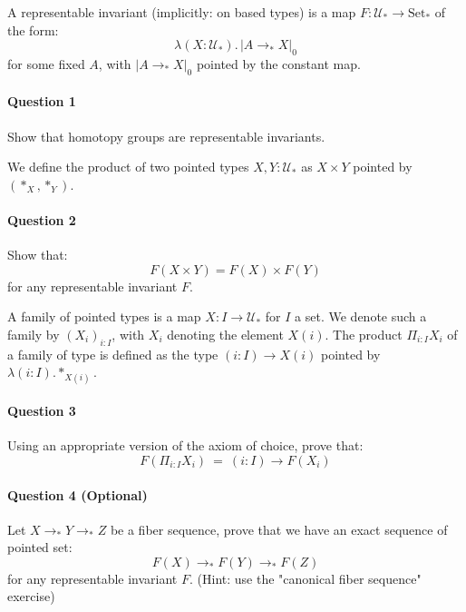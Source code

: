 \documentclass{article}[6pt]%
\newcommand{\U}{{\mathcal U}}
\renewcommand{\r}{\rightarrow}
\newcommand{\Gl}{\lambda}
\newcommand{\Set}{\mathrm{Set}}
\begin{document}
\begin{Exercise}[title={Representable invariants}]
A representable invariant (implicitly: on based types) is a map $F : \U_* \r \Set_*$ of the form:
\[\Gl (X:\U_*).\, |A\r_* X|_0 \]
for some fixed $A$, with $|A\r_*X|_0$ pointed by the constant map. 

\paragraph{Question 1} Show that homotopy groups are representable invariants.
\vspace{0.6cm}

\noindent We define the product of two pointed types $X,Y:\U_*$ as $X\times Y$ pointed by $(*_X,*_Y)$.
\paragraph{Question 2} Show that:
\[F(X\times Y) = F(X)\times F(Y)\]
for any representable invariant $F$.
\vspace{0.4cm}

\noindent A family of pointed types is a map $X:I\r \U_*$ for $I$ a set. We denote such a family by $(X_i)_{i:I}$, with $X_i$ denoting the element $X(i)$. 
The product $\Pi_{i:I}X_i$ of a family of type is defined as the type $(i:I)\r X(i)$ pointed by $\Gl (i:I).*_{X(i)}$.

\paragraph{Question 3}  Using an appropriate version of the axiom of choice, prove that: 
\[F(\Pi_{i:I}X_i) \ = \ (i:I)\r F(X_i)\]  

\paragraph{Question 4 (Optional)} Let $X\r_* Y\r_* Z$ be a fiber sequence, prove that we have an exact sequence of pointed set:
\[F(X)\r_* F(Y)\r_* F(Z)\]
for any representable invariant $F$. (Hint: use the "canonical fiber sequence" exercise)

\end{Exercise}
\end{document}
